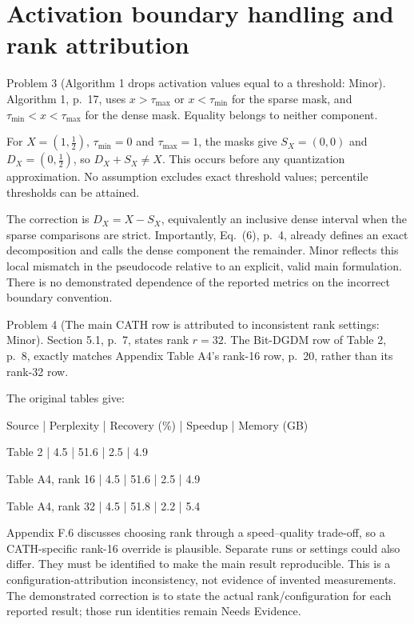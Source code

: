\documentclass[10pt]{article}
\begin{document}
\section*{Activation boundary handling and rank attribution}
Problem 3 (Algorithm 1 drops activation values equal to a threshold: Minor).  Algorithm 1, p. 17, uses \(x>\tau_{\max}\) or \(x<\tau_{\min}\) for the sparse mask, and \(\tau_{\min}<x<\tau_{\max}\) for the dense mask. Equality belongs to neither component.\par
For \(X=(1,\tfrac12)\), \(\tau_{\min}=0\) and \(\tau_{\max}=1\), the masks give \(S_X=(0,0)\) and \(D_X=(0,\tfrac12)\), so \(D_X+S_X\ne X\). This occurs before any quantization approximation. No assumption excludes exact threshold values; percentile thresholds can be attained.\par
The correction is \(D_X=X-S_X\), equivalently an inclusive dense interval when the sparse comparisons are strict. Importantly, Eq. (6), p. 4, already defines an exact decomposition and calls the dense component the remainder. Minor reflects this local mismatch in the pseudocode relative to an explicit, valid main formulation. There is no demonstrated dependence of the reported metrics on the incorrect boundary convention.\par
Problem 4 (The main CATH row is attributed to inconsistent rank settings: Minor).  Section 5.1, p. 7, states rank \(r=32\). The Bit-DGDM row of Table 2, p. 8, exactly matches Appendix Table A4’s rank-16 row, p. 20, rather than its rank-32 row.\par
The original tables give:\par
Source | Perplexity | Recovery (\%) | Speedup | Memory (GB)\par
Table 2 | 4.5 | 51.6 | 2.5 | 4.9\par
Table A4, rank 16 | 4.5 | 51.6 | 2.5 | 4.9\par
Table A4, rank 32 | 4.5 | 51.8 | 2.2 | 5.4\par
Appendix F.6 discusses choosing rank through a speed–quality trade-off, so a CATH-specific rank-16 override is plausible. Separate runs or settings could also differ. They must be identified to make the main result reproducible. This is a configuration-attribution inconsistency, not evidence of invented measurements. The demonstrated correction is to state the actual rank/configuration for each reported result; those run identities remain Needs Evidence.\par
\end{document}
